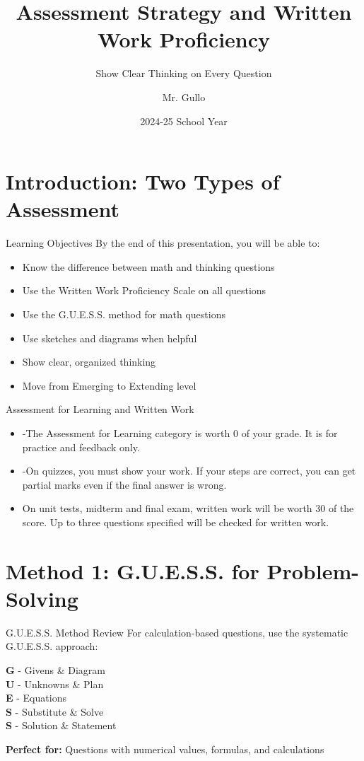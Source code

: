 \documentclass{beamer}
\title[Assessment Tips and Proficiency]{Assessment Strategy and Written Work Proficiency}
\subtitle{Show Clear Thinking on Every Question}
\author[Mr. Gullo]{Mr. Gullo}
\date[2024-25]{2024-25 School Year}
\begin{document}
\frame{\titlepage}

\section{Introduction: Two Types of Assessment}

\begin{frame}{Learning Objectives}
By the end of this presentation, you will be able to:
\begin{itemize}
\item Know the difference between math and thinking questions \pause
\item Use the Written Work Proficiency Scale on all questions \pause
\item Use the G.U.E.S.S. method for math questions \pause
\item Use sketches and diagrams when helpful \pause
\item Show clear, organized thinking \pause
\item Move from Emerging to Extending level
\end{itemize}
\end{frame}

\begin{frame}{Assessment for Learning and Written Work}
\begin{itemize}

\item -The Assessment for Learning category is worth 0 of your grade. It is for practice and feedback only. \pause
\item -On quizzes, you must show your work. If your steps are correct, you can get partial marks even if the final answer is wrong. \pause
\item On unit tests, midterm and final exam, written work will be worth 30 of the score.  \pause Up to three questions specified will be checked for written work. 
\end{itemize}
\end{frame}


\section{Method 1: G.U.E.S.S. for Problem-Solving}

\begin{frame}{G.U.E.S.S. Method Review}
For calculation-based questions, use the systematic G.U.E.S.S. approach:

\pause
\vspace{0.5cm}
\begin{flushleft}
\textbf{G} - Givens \& Diagram \pause \\
\textbf{U} - Unknowns \& Plan \pause \\
\textbf{E} - Equations \pause \\
\textbf{S} - Substitute \& Solve \pause \\
\textbf{S} - Solution \& Statement \\
\end{flushleft}

\pause
\vspace{0.5cm}
\textbf{Perfect for:} Questions with numerical values, formulas, and calculations
\end{frame}
\end{document}
